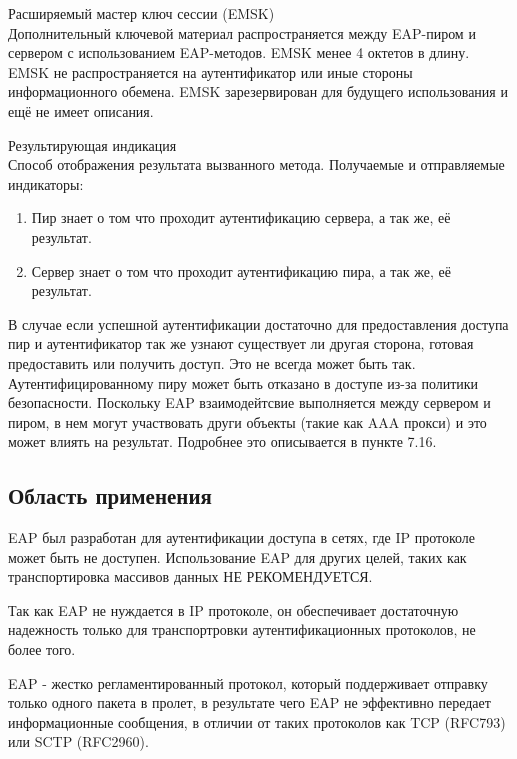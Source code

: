 Расширяемый мастер ключ сессии (EMSK) \\ Дополнительный ключевой материал распространяется между EAP-пиром и сервером с использованием EAP-методов. EMSK менее 4 октетов в длину. EMSK не распространяется на аутентификатор или иные стороны информационного обемена. EMSK зарезервирован для будущего использования и ещё не имеет описания.

Результирующая индикация \\ Способ отображения результата вызванного метода. Получаемые и отправляемые индикаторы:

\begin{enumerate}
\item Пир знает о том что проходит аутентификацию сервера, а так же, её результат.
\item Сервер знает о том что проходит аутентификацию пира, а так же, её результат.
\end{enumerate}

В случае если успешной аутентификации достаточно для предоставления доступа пир и аутентификатор так же узнают существует ли другая сторона, готовая предоставить или получить доступ. Это не всегда может быть так. Аутентифицированному пиру может быть отказано в доступе из-за политики безопасности. Поскольку EAP взаимодейтсвие выполняется между сервером и пиром, в нем могут участвовать други объекты (такие как AAA прокси) и это может влиять на результат. Подробнее это описывается в пункте 7.16.

\subsection{Область применения}

EAP был разработан для аутентификации доступа в сетях, где IP протоколе может быть не доступен. Использование EAP для других целей, таких как транспортировка массивов данных НЕ РЕКОМЕНДУЕТСЯ.

Так как EAP не нуждается в IP протоколе, он обеспечивает достаточную надежность только для транспортровки аутентификационных протоколов, не более того.

EAP - жестко регламентированный протокол, который поддерживает отправку только одного пакета в пролет, в результате чего EAP не эффективно передает информационные сообщения, в отличии от таких протоколов как TCP (RFC793) или SCTP (RFC2960).



